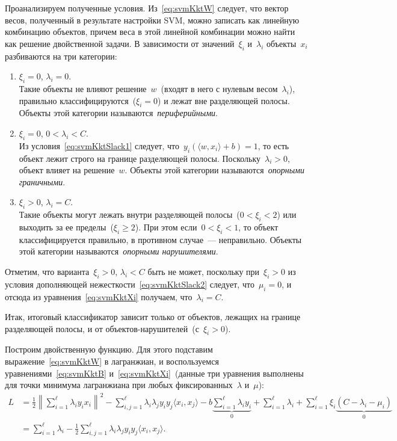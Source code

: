 \documentclass[12pt,fleqn]{article}
\begin{document}
Проанализируем полученные условия.
Из~\eqref{eq:svmKktW} следует, что вектор весов, полученный в результате
настройки SVM, можно записать как линейную комбинацию объектов,
причем веса в этой линейной комбинации можно найти как решение двойственной задачи.
В зависимости от значений~$\xi_i$ и~$\lambda_i$ объекты~$x_i$ разбиваются на три категории:
\begin{enumerate}
    \item $\xi_i = 0$, $\lambda_i = 0$. \\
        Такие объекты не влияют решение~$w$~(входят в него с нулевым весом~$\lambda_i$),
        правильно классифицируются~($\xi_i = 0$) и лежат вне разделяющей полосы.
        Объекты этой категории называются~\emph{периферийными}.
    \item $\xi_i = 0$, $0 < \lambda_i < C$. \\
        Из условия~\eqref{eq:svmKktSlack1} следует, что~$y_i \left(\langle w, x_i \rangle + b \right) = 1$,
        то есть объект лежит строго на границе разделяющей полосы.
        Поскольку~$\lambda_i > 0$, объект влияет на решение~$w$.
        Объекты этой категории называются~\emph{опорными граничными}.
    \item $\xi_i > 0$, $\lambda_i = C$. \\
        Такие объекты могут лежать внутри разделяющей полосы~($0 < \xi_i < 2$)
        или выходить за ее пределы~($\xi_i \geq 2$).
        При этом если~$0 < \xi_i < 1$, то объект классифицируется правильно,
        в противном случае~--- неправильно.
        Объекты этой категории называются~\emph{опорными нарушителями}.
\end{enumerate}

Отметим, что варианта~$\xi_i > 0$, $\lambda_i < C$ быть не может,
поскольку при~$\xi_i > 0$ из условия дополняющей нежесткости~\eqref{eq:svmKktSlack2}
следует, что~$\mu_i = 0$, и отсюда из уравнения~\eqref{eq:svmKktXi} получаем,
что~$\lambda_i = C$.

Итак, итоговый классификатор зависит только от объектов, лежащих
на границе разделяющей полосы, и от объектов-нарушителей~(с~$\xi_i > 0$).

Построим двойственную функцию.
Для этого подставим выражение~\eqref{eq:svmKktW} в лагранжиан,
и воспользуемся уравнениями~\eqref{eq:svmKktB} и~\eqref{eq:svmKktXi}~(данные
три уравнения выполнены для точки минимума лагранжиана при
любых фиксированных~$\lambda$ и~$\mu$):
\begin{align*}
    L &= \frac{1}{2} \left\|
            \sum_{i = 1}^{\ell}
                \lambda_i y_i x_i
        \right\|^2
        -
        \sum_{i, j = 1}^{\ell}
            \lambda_i \lambda_j y_i y_j \langle x_i, x_j \rangle
        -
        b
        \underbrace{\sum_{i = 1}^{\ell}
            \lambda_i y_i}_{0}
        +
        \sum_{i = 1}^{\ell}
            \lambda_i
        +
        \sum_{i = 1}^{\ell}
            \xi_i \underbrace{(C - \lambda_i - \mu_i)}_{0} \\
    &=
    \sum_{i = 1}^{\ell}
        \lambda_i
    -
    \frac{1}{2} \sum_{i, j = 1}^{\ell}
        \lambda_i \lambda_j y_i y_j \langle x_i, x_j \rangle.
\end{align*}
\end{document}
